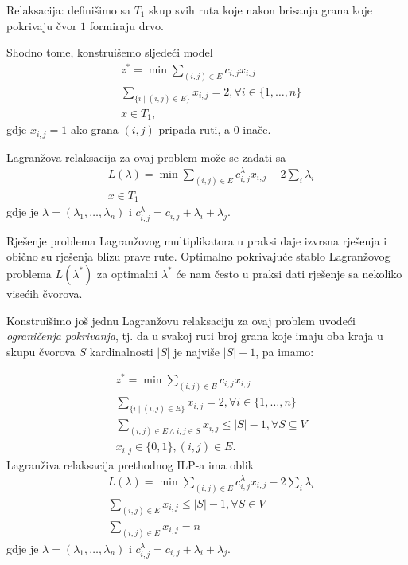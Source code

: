 \documentclass[a4paper, utf8, 11pt, colorlinks]{book}
\begin{document}
Relaksacija: definišimo sa $T_1$ skup svih ruta koje nakon brisanja grana koje pokrivaju čvor $1$ formiraju drvo.  

Shodno tome, konstruišemo sljedeći model
\begin{align*}
    &z^* = \min \sum_{(i,j)\in E} c_{i,j} x_{i,j}\\
    & \sum_{ \{ i \mid (i,j) \in E \} } x_{i,j} = 2, \forall i \in \{1,\ldots, n \} \\
    & x \in T_1,
\end{align*}
gdje $x_{i,j} = 1$ ako grana $(i,j)$ pripada ruti, a 0 inače.

Lagranžova relaksacija za ovaj problem može se zadati sa 
\begin{align*}
     &L(\lambda) = \min \sum_{(i,j)\in E} c^\lambda_{i,j} x_{i,j} - 2 \sum_{i} \lambda_i \\
     & x \in T_1
\end{align*}
gdje je $\lambda=(\lambda_1, \ldots, \lambda_n)$ i $c^\lambda_{i,j} = c_{i,j} + \lambda_i + \lambda_j$. 

Rješenje problema Lagranžovog multiplikatora u praksi daje izvrsna rješenja i obično su rješenja blizu prave rute. Optimalno pokrivajuće stablo Lagranžovog problema $L(\lambda^*)$ za optimalni $\lambda^*$ će nam često u praksi dati rješenje sa  nekoliko visećih čvorova. 

Konstruišimo još jednu Lagranžovu relaksaciju za ovaj problem uvodeći \emph{ograničenja pokrivanja}, tj. da u svakoj ruti broj grana koje imaju oba kraja u skupu čvorova $S$ kardinalnosti $|S|$ je najviše $|S|-1$, pa imamo: 

\begin{align*}
     & z^* = \min \sum_{(i,j)\in E} c_{i,j} x_{i,j} \\
     & \sum_{ \{ i \mid (i,j) \in E \} } x_{i,j} = 2, \forall i \in \{1,\ldots, n \} \\
     & \sum_{(i,j) \in E  \wedge i,j \in S} x_{i,j} \leq |S|-1, \forall S \subseteq V \\
     & x_{i,j} \in \{0, 1 \}, (i,j)\in E.
\end{align*}
Lagranživa relaksacija prethodnog ILP-a ima oblik 
\begin{align*}
 &L(\lambda) = \min \sum_{(i,j)\in E} c^\lambda_{i,j} x_{i,j} - 2 \sum_{i} \lambda_i \\
 & \sum_{(i,j) \in E} x_{i,j} \leq |S|-1, \forall S \in V \\
 & \sum_{(i,j) \in E} x_{i,j} = n
\end{align*}
gdje je $\lambda=(\lambda_1, \ldots, \lambda_n)$ i $c^\lambda_{i,j} = c_{i,j} + \lambda_i + \lambda_j$. 
\end{document}
